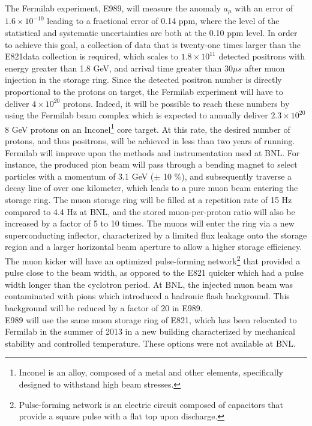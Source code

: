 \documentclass{outhesis}
\begin{document}
The Fermilab experiment, E989, will measure the anomaly $a_{\mu}$ with an error of $1.6 \times 10^{-10}$ leading to a fractional error of 0.14 ppm, where the level of the statistical and systematic uncertainties are both at the 0.10 ppm level. In order to achieve this goal, a collection of data that is twenty-one times larger than the E821data collection is required, which scales to $1.8\times10^{11}$ detected positrons with energy greater than 1.8 GeV, and arrival time greater than $30 \mu s$ after muon injection in the storage ring. Since the detected positron number is directly proportional to the protons on target, the Fermilab experiment will have to deliver $4\times10^{20}$ protons. Indeed, it will be possible to reach these numbers by using the Fermilab beam complex which is expected to annually deliver $2.3 \times 10^{20}$ 8 GeV protons on an Inconel\footnote{Inconel is an alloy, composed of a metal and other elements, specifically designed to withstand high beam stresses.} core target. At this rate, the desired number of protons, and thus positrons, will be achieved in less than two years of running. \\
Fermilab will improve upon the methods and instrumentation used at BNL. For instance, the produced pion beam will pass through a bending magnet to select particles with a momentum of 3.1 GeV ($\pm$ 10 \%), and subsequently traverse a decay line of over one kilometer, which leads to a pure muon beam entering the storage ring. The muon storage ring will be filled at a repetition rate of 15 Hz compared to 4.4 Hz at BNL, and the stored muon-per-proton ratio will also be increased by a factor of 5 to 10 times. The muons will enter the ring via a new superconducting inflector, characterized by a limited flux leakage onto the storage region and a larger horizontal beam aperture to allow a higher storage efficiency. The muon kicker will have an optimized pulse-forming network\footnote{Pulse-forming network is an electric circuit composed of capacitors that provide a square pulse with a flat top upon discharge.} that provided a pulse close to the beam width, as opposed to the E821 quicker which had a pulse width longer than the cyclotron period. At BNL, the injected muon beam was contaminated with pions which introduced a hadronic flash background. This background will be reduced by a factor of 20 in E989. \\
E989 will use the same muon storage ring of E821, which has been relocated to Fermilab in the summer of 2013 in a new building characterized by mechanical stability and controlled temperature. These options were not available at BNL.\\
\end{document}
